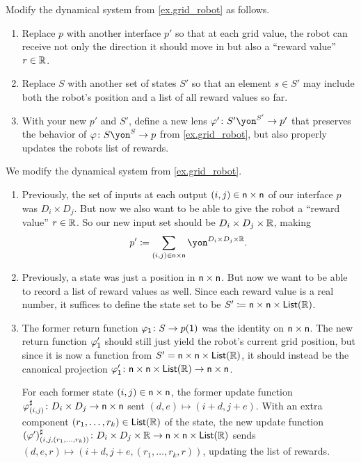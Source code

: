 \documentclass[Book-Poly]{subfiles}
\begin{document}
\begin{exercise} \label{exc.grid_reward}
Modify the dynamical system from \cref{ex.grid_robot} as follows.
\begin{enumerate}
	\item Replace $p$ with another interface $p'$ so that at each grid value, the robot can receive not only the direction it should move in but also a ``reward value'' $r\in\mathbb{R}$.
	\item Replace $S$ with another set of states $S'$ so that an element $s\in S'$ may include both the robot's position and a list of all reward values so far.
	\item With your new $p'$ and $S'$, define a new lens $\varphi'\colon S'\yon^{S'}\to p'$ that preserves the behavior of $\varphi\colon S\yon^S\to p$ from \cref{ex.grid_robot}, but also properly updates the robots list of rewards.
\qedhere
\end{enumerate}
\begin{solution}
We modify the dynamical system from \cref{ex.grid_robot}.
\begin{enumerate}
    \item Previously, the set of inputs at each output $(i,j)\in\mathsf{n}\times\mathsf{n}$ of our interface $p$ was $D_i\times D_j$.
    But now we also want to be able to give the robot a ``reward value'' $r\in\mathbb{R}$.
    So our new input set should be $D_i\times D_j\times\mathbb{R}$, making
    \[
        p'\coloneqq\sum_{(i,j)\in\ord{n}\times\ord{n}} \yon^{D_i\times D_j\times\rr}.
    \]
    \item Previously, a state was just a position in $\mathsf{n}\times\mathsf{n}$.
    But now we want to be able to record a list of reward values as well.
    Since each reward value is a real number, it suffices to define the state set to be $S'\coloneqq\mathsf{n}\times\mathsf{n}\times\mathsf{List}(\mathbb{R})$.
    \item The former return function $\varphi_{\textsf{1}}\colon S\to p(\textsf{1})$ was the identity on $\mathsf{n}\times\mathsf{n}$.
    The new return function $\varphi'_{\textsf{1}}$ should still just yield the robot's current grid position, but since it is now a function from $S'=\mathsf{n}\times\mathsf{n}\times\mathsf{List}(\mathbb{R})$, it should instead be the canonical projection $\varphi'_{\textsf{1}}\colon \mathsf{n}\times\mathsf{n}\times\mathsf{List}(\mathbb{R})\to\mathsf{n}\times\mathsf{n}$.

    For each former state $(i,j)\in\mathsf{n}\times\mathsf{n}$, the former update function $\varphi^\sharp_{(i,j)}\colon D_i\times D_j\to\mathsf{n}\times\mathsf{n}$ sent $(d,e)\mapsto(i+d,j+e)$.
    With an extra component $(r_1,\ldots,r_k)\in\mathsf{List}(\mathbb{R})$ of the state, the new update function $(\varphi')^\sharp_{(i,j,(r_1,\ldots,r_k))}\colon D_i\times D_j\times\mathbb{R}\to\mathsf{n}\times\mathsf{n}\times\mathsf{List}(\mathbb{R})$ sends $(d,e,r)\mapsto(i+d,j+e,(r_1,\ldots,r_k,r))$, updating the list of rewards.
\end{enumerate}
\end{solution}
\end{exercise}
\end{document}
